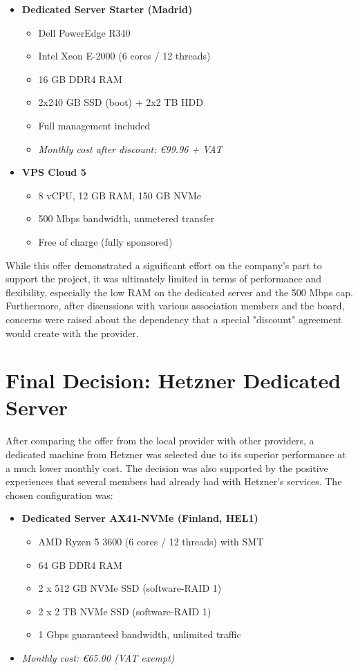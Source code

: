 \begin{itemize}
  \item \textbf{Dedicated Server Starter (Madrid)}
    \begin{itemize}
      \item Dell PowerEdge R340
      \item Intel Xeon E-2000 (6 cores / 12 threads)
      \item 16 GB DDR4 RAM
      \item 2x240 GB SSD (boot) + 2x2 TB HDD
      \item Full management included
      \item \textit{Monthly cost after discount: €99.96 + VAT}
    \end{itemize}
  \item \textbf{VPS Cloud 5}
    \begin{itemize}
      \item 8 vCPU, 12 GB RAM, 150 GB NVMe
      \item 500 Mbps bandwidth, unmetered transfer
      \item Free of charge (fully sponsored)
    \end{itemize}
\end{itemize}

While this offer demonstrated a significant effort on the company's part to support the project, it was ultimately limited in terms of performance and flexibility, especially the low RAM on the dedicated server and the 500 Mbps cap. Furthermore, after discussions with various association members and the board, concerns were raised about the dependency that a special "discount" agreement would create with the provider.

\section{Final Decision: Hetzner Dedicated Server}

After comparing the offer from the local provider with other providers, a dedicated machine from Hetzner was selected due to its superior performance at a much lower monthly cost. The decision was also supported by the positive experiences that several members had already had with Hetzner's services. The chosen configuration was:

\begin{itemize}
  \item \textbf{Dedicated Server AX41-NVMe (Finland, HEL1)}
  \begin{itemize}
    \item AMD Ryzen 5 3600 (6 cores / 12 threads) with SMT
    \item 64 GB DDR4 RAM
    \item 2 x 512 GB NVMe SSD (software-RAID 1)
    \item 2 x 2 TB NVMe SSD (software-RAID 1)
    \item 1 Gbps guaranteed bandwidth, unlimited traffic
  \end{itemize}
  \item \textit{Monthly cost: €65.00 (VAT exempt)}
\end{itemize}


